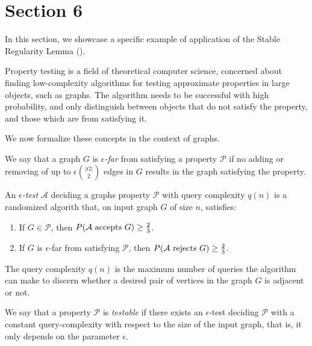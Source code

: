\section{Section 6} \label{sec:section_6}

    In this section, we showcase a specific example of application of the Stable Regularity Lemma
    ().

    Property testing is a field of theoretical computer science, concerned about finding low-complexity algorithms
    for testing approximate properties in large objects, such as graphs.
    The algorithm needs to be successful with high probability, and only distinguish between objects that do not
    satisfy the property, and those which are  from satisfying it.

    We now formalize these concepts in the context of graphs.

    \begin{definition}
        We say that a graph $G$ is \emph{$\epsilon$-far} from satisfying a property $\mathcal{P}$ if no adding or
        removing of up to $\epsilon {|G| \choose 2}$ edges in $G$ results in the graph satisfying the property.

        An \emph{$\epsilon$-test} $\mathcal{A}$ deciding a graphs property $\mathcal{P}$ with query complexity
        $q(n)$ is a randomized algorith that, on input graph $G$ of size $n$,
        satisfies:
        \begin{enumerate}
            \item If $G \in \mathcal{P}$, then $P( \mathcal{A} \text{ accepts } G ) \geq \frac{2}{3}$.
            \item If $G$ is $\epsilon$-far from satisfying $\mathcal{P}$,
                then $P( \mathcal{A} \text{ rejects } G ) \geq \frac{2}{3}$.
        \end{enumerate}

        The query complexity $q(n)$ is the maximum number of queries the algorithm can make to discern whether a desired
        pair of vertices in the graph $G$ is adjacent or not.

        We say that a property $\mathcal{P}$ is \emph{testable} if there exists an $\epsilon$-test deciding $\mathcal{P}$
        with a constant query-complexity with respect to the size of the input graph, that is, it only depends on the
        parameter $\epsilon$.
    \end{definition}

